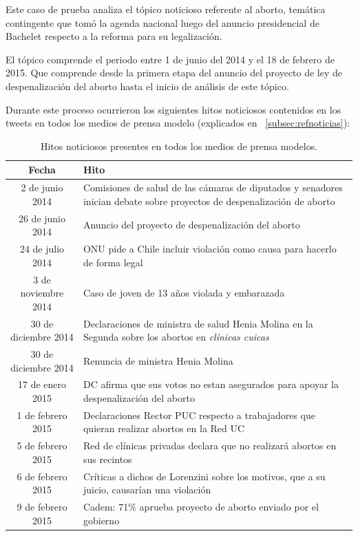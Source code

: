 
Este caso de prueba analiza el tópico noticioso referente al aborto, temática contingente que tomó la agenda nacional luego del anuncio presidencial de Bachelet respecto a la reforma para su legalización.

El tópico comprende el periodo entre 1 de junio del 2014 y el 18 de febrero de 2015. Que comprende desde la primera etapa del anuncio del proyecto de ley de despenalización del aborto hasta el inicio de análisis de este tópico. 

Durante este proceso ocurrieron los siguientes hitos noticiosos contenidos en los tweets en todos los medios de prensa modelo (explicados en ~\ref{subsec:refnoticias}):

\begin{table}[H]
	\centering
	\begin{tabular}{| c | p{10cm} |}
		\hline
		Fecha    & Hito \\ \hline
		2 de junio 2014 & Comisiones de salud de las cámaras de diputados y senadores inician debate sobre proyectos de despenalización de aborto \\ \hline
		26 de junio 2014 & Anuncio del proyecto de despenalización del aborto \\ \hline
		24 de julio 2014 & ONU pide a Chile incluir violación como causa para hacerlo de forma legal \\ \hline
		3 de noviembre 2014 & Caso de joven de 13 años violada y embarazada \\ \hline
		30 de diciembre 2014 & Declaraciones de ministra de salud Henia Molina en la Segunda sobre los abortos en \emph{clínicas cuicas}\\ \hline
		30 de diciembre 2014 & Renuncia de ministra Henia Molina \\ \hline
		17 de enero 2015 & DC afirma que sus votos no estan asegurados para apoyar la despenalización del aborto \\ \hline
		1 de febrero 2015 & Declaraciones Rector PUC respecto a trabajadores que quieran realizar abortos en la Red UC \\ \hline
		5 de febrero 2015 & Red de clínicas privadas declara que no realizará abortos en sus recintos \\ \hline
		6 de febrero 2015 & Críticas a dichos de Lorenzini sobre los motivos, que a su juicio, causarían una violación \\ \hline
		9 de febrero 2015 & Cadem: 71\% aprueba proyecto de aborto enviado por el gobierno \\ \hline
	\end{tabular}
	\caption {Hitos noticiosos presentes en todos los medios de prensa modelos.}
	\label{table:123_hitos_noticiosos}
\end{table}

